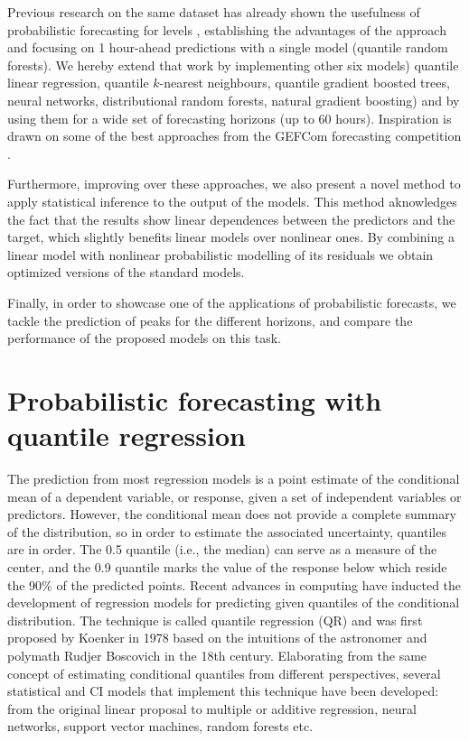 \documentclass[a4paper,3p,sort&compress]{elsarticle}
\begin{document}
Previous research on the same dataset has already shown the usefulness of
probabilistic forecasting for \no levels \cite{proba_aznarte}, establishing the
advantages of the approach and focusing on 1 hour-ahead predictions with a
single model (quantile random forests). We hereby extend that work by
implementing other six models)
  quantile linear regression, 
  quantile $k$-nearest neighbours, 
 quantile gradient boosted trees, 
 neural networks, 
 distributional random forests, 
 natural gradient boosting) and by using them for a wide set of
forecasting horizons (up to 60 hours). Inspiration is drawn on some of the best
approaches from the GEFCom forecasting competition
\cite{quantileknnmangalova,hong_probabilistic_2016}.

Furthermore, improving over these approaches, we also present a novel method to
apply statistical inference to the output of the models. This method aknowledges
the fact that the results show linear dependences between the predictors and the
target, which slightly benefits linear models over nonlinear ones. By combining
a linear model with nonlinear probabilistic modelling of its residuals we obtain
optimized versions of the standard models.

Finally, in order to showcase one of the applications of probabilistic
forecasts, we tackle the prediction of \no peaks for the different horizons, and
compare the performance of the proposed models on this task.

\section{Probabilistic forecasting with quantile regression}
\label{sec:probForec}

The prediction from most regression models is a point estimate of the
conditional mean of a dependent variable, or response, given a set of
independent variables or predictors. However, the conditional mean does not
provide a complete summary of the distribution, so in order to estimate the
associated uncertainty, quantiles are in order. The 0.5 quantile (i.e., the
median) can serve as a measure of the center, and the 0.9 quantile marks the
value of the response below which reside the 90\% of the predicted points.
Recent advances in computing have inducted the development of regression models
for predicting given quantiles of the conditional distribution. The technique is
called quantile regression (QR) and was first proposed by Koenker in 1978
\cite{koenker_regression_1978} based on the intuitions of the astronomer and
polymath Rudjer Boscovich in the 18th century. Elaborating from the same concept
of estimating conditional quantiles from different perspectives, several
statistical and CI models that implement this technique have been developed:
from the original linear proposal to multiple or additive regression, neural
networks, support vector machines, random forests etc.
\end{document}
